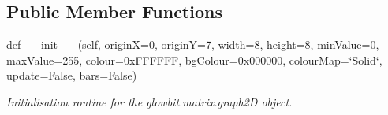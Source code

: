 \subsection*{Public Member Functions}
\begin{DoxyCompactItemize}
\item 
def \hyperlink{classglowbit_1_1glowbitMatrix_1_1graph2D_a6250b96918df343764c1bc268a6e813b}{\+\_\+\+\_\+init\+\_\+\+\_\+} (self, originX=0, originY=7, width=8, height=8, min\+Value=0, max\+Value=255, colour=0x\+F\+F\+F\+F\+F\+F, bg\+Colour=0x000000, colour\+Map=\char`\"{}\+Solid\char`\"{}, update=\+False, bars=\+False)
\begin{DoxyCompactList}\small\item\em Initialisation routine for the glowbit.\+matrix.\+graph2D object. \end{DoxyCompactList}\end{DoxyCompactItemize}
